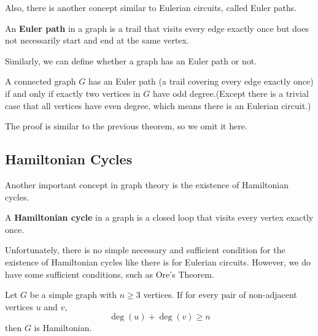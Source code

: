 Also, there is another concept similar to Eulerian circuits, called Euler paths.

\begin{definition}
An \textbf{Euler path} in a graph is a trail that visits every edge exactly once but does not necessarily start and end at the same vertex.
\end{definition}

Similarly, we can define whether a graph has an Euler path or not.

\begin{theorem}
A connected graph $G$ has an Euler path (a trail covering every edge exactly once) if and only if exactly two vertices in $G$ have odd degree.(Except there is a trivial case that all vertices have even degree, which means there is an Eulerian circuit.)
\end{theorem}

The proof is similar to the previous theorem, so we omit it here.

\subsection{Hamiltonian Cycles}

Another important concept in graph theory is the existence of Hamiltonian cycles.

\begin{definition}
A \textbf{Hamiltonian cycle} in a graph is a closed loop that visits every vertex exactly once.
\end{definition}

Unfortunately, there is no simple necessary and sufficient condition for the existence of Hamiltonian cycles like there is for Eulerian circuits. However, we do have some sufficient conditions, such as Ore's Theorem.

\begin{theorem}
Let $G$ be a simple graph with $n \ge 3$ vertices. If for every pair of non-adjacent vertices $u$ and $v$,
\[ \deg(u) + \deg(v) \ge n \]
then $G$ is Hamiltonian.
\end{theorem}

